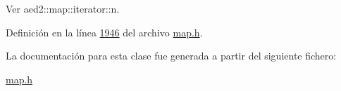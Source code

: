 \-Ver aed2\-::map\-::iterator\-::n. 



\-Definición en la línea \hyperlink{map_8h_source_l01946}{1946} del archivo \hyperlink{map_8h_source}{map.\-h}.



\-La documentación para esta clase fue generada a partir del siguiente fichero\-:\begin{DoxyCompactItemize}
\item 
\hyperlink{map_8h}{map.\-h}\end{DoxyCompactItemize}
